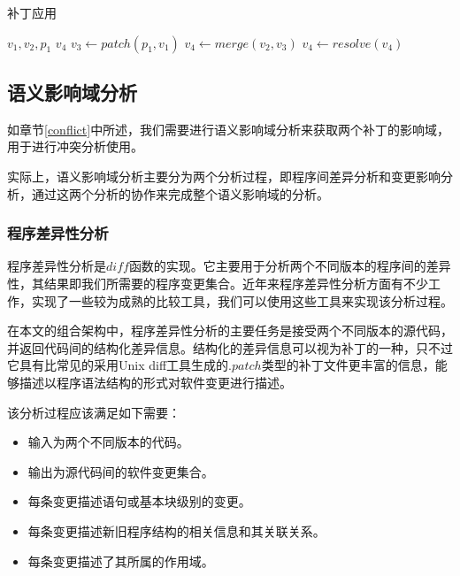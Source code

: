 \begin{algorithm}[H]
	\caption{补丁应用}
	\label{algo_patch}
	\begin{algorithmic}[1]
		\Require $v_1,v_2,p_1$
		\Ensure $v_4$
		\State $v_3 \gets patch(p_1,v_1)$
		\State $v_4 \gets merge(v_2,v_3)$
		\State $v_4 \gets resolve(v_4)$
		\State{}
		\State
			\State{}
		\EndFunction
		\State
			\State{}
		\EndFunction		
	\end{algorithmic}
\end{algorithm}

\subsection{语义影响域分析}
\label {sia}

如章节\ref {conflict}中所述，我们需要进行语义影响域分析来获取两个补丁的影响域，用于进行冲突分析使用。

实际上，语义影响域分析主要分为两个分析过程，即程序间差异分析和变更影响分析，通过这两个分析的协作来完成整个语义影响域的分析。

\subsubsection{程序差异性分析}

程序差异性分析是$diff$函数的实现。它主要用于分析两个不同版本的程序间的差异性，其结果即我们所需要的程序变更集合。近年来程序差异性分析方面有不少工作，实现了一些较为成熟的比较工具，我们可以使用这些工具来实现该分析过程。

在本文的组合架构中，程序差异性分析的主要任务是接受两个不同版本的源代码，并返回代码间的结构化差异信息。结构化的差异信息可以视为补丁的一种，只不过它具有比常见的采用Unix diff工具生成的$.patch$类型的补丁文件更丰富的信息，能够描述以程序语法结构的形式对软件变更进行描述。

该分析过程应该满足如下需要：
\begin{itemize}
	\item 输入为两个不同版本的代码。
	\item 输出为源代码间的软件变更集合。
	\item 每条变更描述语句或基本块级别的变更。
	\item 每条变更描述新旧程序结构的相关信息和其关联关系。
	\item 每条变更描述了其所属的作用域。
\end{itemize}

